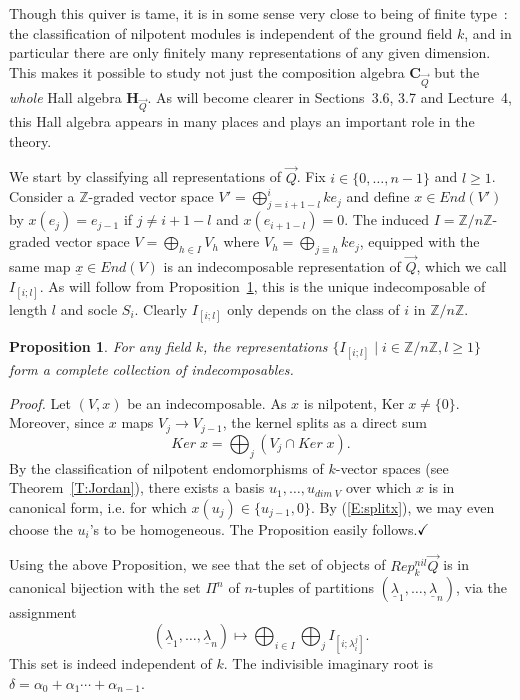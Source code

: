 \documentclass[a4paper,10pt]{amsart}
\def\Z{\mathbb{Z}}
\def\H{\mathbf{H}}
\def\qed{$\hfill \checkmark$}
\def\a{\alpha}
\newtheorem{prop}[theo]{Proposition}
\numberwithin{equation}{section}
\begin{document}
\vspace{.4in}

Though this quiver is tame, it is in some sense very close to being of finite type~: the classification of nilpotent modules is independent of the ground field $k$, and in particular there are only finitely many representations of any given dimension. This makes it possible to study not just the composition algebra $\mathbf{C}_{\vec{Q}}$ but the \textit{whole} Hall algebra ${\H}_{\vec{Q}}$. As will become clearer in Sections~3.6, 3.7 and Lecture~4, this Hall algebra appears in many places and plays an important role in the theory.

\vspace{.1in}

We start by classifying all representations of $\vec{Q}$. Fix $i \in \{0, \ldots, n-1\}$ and $l \geq 1$. Consider a $\Z$-graded vector space $V'=\bigoplus_{j=i+1-l}^{i} k e_j$ and define $x \in {End}(V')$ by $x(e_j)=e_{j-1}$ if $j \neq i+1-l$ and $x(e_{i+1-l})=0$. The induced $I=\Z/n\Z$-graded vector space
$V=\bigoplus_{h \in I} V_h$ where $V_h=\bigoplus_{j \equiv h} ke_j$, equipped with the same map $\underline{x}\in {End}(V)$ is an indecomposable representation of $\vec{Q}$, which we call $I_{[i;l]}$. As will follow from Proposition~\ref{P:classcyclic}, this is the unique indecomposable of length $l$ and socle $S_i$. Clearly $I_{[i;l]}$ only depends on the class of $i$ in $\Z/n\Z$.

\begin{prop}\label{P:classcyclic} For any field $k$, the representations $\{I_{[i;l]}\;|\; i \in \Z/n\Z,  l \geq 1\}$ form a complete collection of indecomposables.\end{prop}
\noindent
\textit{Proof.} Let $(V,x)$ be an indecomposable. As $x$ is nilpotent, $\text{Ker}\;x \neq \{0\}$. Moreover, since $x$ maps $V_j \to V_{j-1}$, the kernel splits as a direct sum
\begin{equation}\label{E:splitx}
{Ker}\;x=\bigoplus_j (V_j \cap {Ker}\;x).
\end{equation}
By the classification of nilpotent endomorphisms of $k$-vector spaces (see Theorem~\ref{T:Jordan}), there exists a basis $u_1, \ldots, u_{{dim}\;V}$ over which $x$ is in canonical form, i.e. for which $x(u_j) \in \{u_{j-1},0\}$. By (\ref{E:splitx}), we may even choose the $u_i$'s to be homogeneous. The Proposition easily follows.\qed

\vspace{.15in}

Using the above Proposition, we see that the set of objects of $Rep^{nil}_k\vec{Q}$ is in canonical bijection with the set $\Pi^n$ of $n$-tuples of partitions $(\underline{\lambda}_1, \ldots, \underline{\lambda}_n)$, via the assignment
$$(\underline{\lambda}_1, \ldots, \underline{\lambda}_n) \mapsto \bigoplus_{i \in I} \bigoplus_{j} I_{[i;\lambda_i^j]}.$$
This set is indeed independent of $k$. The indivisible imaginary root is $\delta=\a_0+ \a_1 \cdots +\a_{n-1}$.
\end{document}
